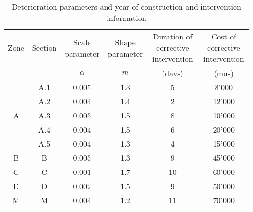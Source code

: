 \begin{table}%
\caption{Deterioration parameters and year of construction and intervention information}
\label{tbl-reliability-a:8}
{
\begin{tabular}{|l|l|l|l|l|l|}
\hline
\multicolumn{1}{|c|}{Zone} & \multicolumn{1}{c|}{Section} & \multicolumn{1}{c|}{Scale parameter} & \multicolumn{1}{c|}{Shape parameter} & \multicolumn{1}{c|}{Duration of corrective intervention} & \multicolumn{1}{c|}{Cost of corrective intervention} \\ 
\multicolumn{1}{|c|}{} & \multicolumn{1}{c|}{} & \multicolumn{1}{c|}{$\alpha$} & \multicolumn{1}{c|}{$m$} & \multicolumn{1}{c|}{(days)} & \multicolumn{1}{c|}{(mus)} \\ 
\hline
\multicolumn{1}{|c|}{} & \multicolumn{1}{c|}{A.1} & \multicolumn{1}{c|}{0.005} & \multicolumn{1}{c|}{1.3} & \multicolumn{1}{c|}{5} & \multicolumn{1}{c|}{8'000} \\ 
\cline{2-6}
\multicolumn{1}{|c|}{} & \multicolumn{1}{c|}{A.2} & \multicolumn{1}{c|}{0.004} & \multicolumn{1}{c|}{1.4} & \multicolumn{1}{c|}{2} & \multicolumn{1}{c|}{12'000} \\ 
\cline{2-6}
\multicolumn{1}{|c|}{A} & \multicolumn{1}{c|}{A.3} & \multicolumn{1}{c|}{0.003} & \multicolumn{1}{c|}{1.5} & \multicolumn{1}{c|}{8} & \multicolumn{1}{c|}{10'000} \\ 
\cline{2-6}
\multicolumn{1}{|c|}{} & \multicolumn{1}{c|}{A.4} & \multicolumn{1}{c|}{0.004} & \multicolumn{1}{c|}{1.5} & \multicolumn{1}{c|}{6} & \multicolumn{1}{c|}{20'000} \\ 
\cline{2-6}
\multicolumn{1}{|c|}{} & \multicolumn{1}{c|}{A.5} & \multicolumn{1}{c|}{0.004} & \multicolumn{1}{c|}{1.3} & \multicolumn{1}{c|}{4} & \multicolumn{1}{c|}{15'000} \\ 
\hline
\multicolumn{1}{|c|}{B} & \multicolumn{1}{c|}{B} & \multicolumn{1}{c|}{0.003} & \multicolumn{1}{c|}{1.3} & \multicolumn{1}{c|}{9} & \multicolumn{1}{c|}{45'000} \\ 
\hline
\multicolumn{1}{|c|}{C} & \multicolumn{1}{c|}{C} & \multicolumn{1}{c|}{0.001} & \multicolumn{1}{c|}{1.7} & \multicolumn{1}{c|}{10} & \multicolumn{1}{c|}{60'000} \\ 
\hline
\multicolumn{1}{|c|}{D} & \multicolumn{1}{c|}{D} & \multicolumn{1}{c|}{0.002} & \multicolumn{1}{c|}{1.5} & \multicolumn{1}{c|}{9} & \multicolumn{1}{c|}{50'000} \\ 
\hline
\multicolumn{1}{|c|}{M} & \multicolumn{1}{c|}{M} & \multicolumn{1}{c|}{0.004} & \multicolumn{1}{c|}{1.2} & \multicolumn{1}{c|}{11} & \multicolumn{1}{c|}{70'000} \\ 
\hline
\end{tabular}
}
\end{table}

